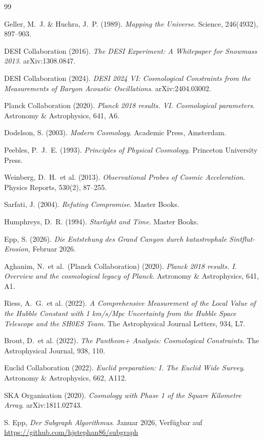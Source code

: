 ﻿\documentclass[a4paper,12pt]{article}
\theoremstyle{definition}
\theoremstyle{remark}
\begin{document}
\begin{thebibliography}{99}

  Geller, M.~J. \& Huchra, J.~P. (1989).
  \textit{Mapping the Universe}.
  Science, 246(4932), 897--903.

  DESI Collaboration (2016).
  \textit{The DESI Experiment: A Whitepaper for Snowmass 2013}.
  arXiv:1308.0847.

  DESI Collaboration (2024).
  \textit{DESI 2024 VI: Cosmological Constraints from the Measurements of
  Baryon Acoustic Oscillations}.
  arXiv:2404.03002.

  Planck Collaboration (2020).
  \textit{Planck 2018 results. VI. Cosmological parameters}.
  Astronomy \& Astrophysics, 641, A6.

  Dodelson, S. (2003).
  \textit{Modern Cosmology}.
  Academic Press, Amsterdam.

  Peebles, P.~J.~E. (1993).
  \textit{Principles of Physical Cosmology}.
  Princeton University Press.

  Weinberg, D.~H.\ et al. (2013).
  \textit{Observational Probes of Cosmic Acceleration}.
  Physics Reports, 530(2), 87--255.

  Sarfati, J. (2004).
  \textit{Refuting Compromise}.
  Master Books.

  Humphreys, D.~R. (1994).
  \textit{Starlight and Time}.
  Master Books.

  Epp, S. (2026).
  \textit{Die Entstehung des Grand Canyon durch katastrophale Sintflut-Erosion},
  Februar 2026.

  Aghanim, N.\ et al.\ (Planck Collaboration) (2020).
  \textit{Planck 2018 results. I. Overview and the cosmological legacy of
  Planck}. Astronomy \& Astrophysics, 641, A1.

  Riess, A.~G.\ et al. (2022).
  \textit{A Comprehensive Measurement of the Local Value of the Hubble
  Constant with 1 km/s/Mpc Uncertainty from the Hubble Space Telescope
  and the SH0ES Team}.
  The Astrophysical Journal Letters, 934, L7.

  Brout, D.\ et al. (2022).
  \textit{The Pantheon+ Analysis: Cosmological Constraints}.
  The Astrophysical Journal, 938, 110.

  Euclid Collaboration (2022).
  \textit{Euclid preparation: I. The Euclid Wide Survey}.
  Astronomy \& Astrophysics, 662, A112.

  SKA Organisation (2020).
  \textit{Cosmology with Phase 1 of the Square Kilometre Array}.
  arXiv:1811.02743.

  S. Epp, 
  \textit{Der Subgraph Algorithmus}. Januar 2026, Verfügbar auf \url{https://github.com/hjstephan86/subgraph}

\end{thebibliography}
\end{document}
